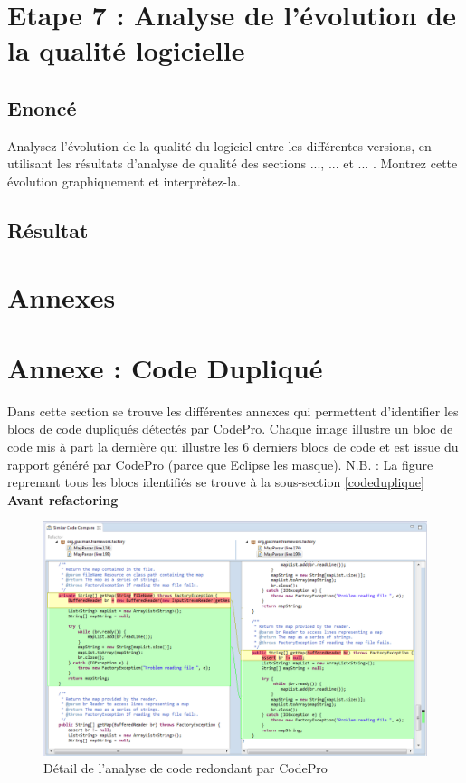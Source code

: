 \documentclass[12pt,a4paper,final]{article}
\newcommand{\smalltitle}[1]{\bigskip\large\textbf{#1}\par\normalsize\medskip}
\begin{document}
\newpage
\section{Etape 7 : Analyse de l'évolution de la qualité logicielle}\label{sec:etape7}
\subsection{Enoncé} 
Analysez l'évolution de la qualité du logiciel entre les différentes versions, en utilisant les résultats d'analyse de qualité des sections ..., ... et ... . Montrez cette évolution graphiquement et interprètez-la.
\subsection{Résultat}

\clearpage
\newpage
\section{Annexes} \label{sec:annexe}
\appendix %
\section{Annexe : Code Dupliqué}\label{SimilarCode}
Dans cette section se trouve les différentes annexes qui permettent d'identifier les blocs de code dupliqués détectés par CodePro. Chaque image illustre un bloc de code mis à part la dernière qui illustre les 6 derniers blocs de code et est issue du rapport généré par CodePro (parce que Eclipse les masque).
N.B. : La figure reprenant tous les blocs identifiés se trouve à la sous-section \ref{codeduplique}
\smalltitle{Avant refactoring}
\begin{figure}[ht]
	\centering
	\includegraphics[width=\textwidth]{images/SimilarCode_1.png}
	\caption{\label{SimilarCode1}Détail de l'analyse de code redondant par CodePro}
\end{figure}
\end{document}
